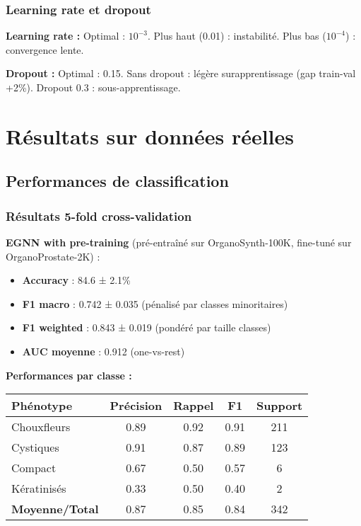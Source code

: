 \subsubsection{Learning rate et dropout}

\textbf{Learning rate :}
Optimal : $10^{-3}$. Plus haut (0.01) : instabilité. Plus bas ($10^{-4}$) : convergence lente.

\textbf{Dropout :}
Optimal : 0.15. Sans dropout : légère surapprentissage (gap train-val +2\%). Dropout 0.3 : sous-apprentissage.

\section{Résultats sur données réelles}

\subsection{Performances de classification}

\subsubsection{Résultats 5-fold cross-validation}

\textbf{EGNN with pre-training} (pré-entraîné sur OrganoSynth-100K, fine-tuné sur OrganoProstate-2K) :
\begin{itemize}
    \item \textbf{Accuracy} : 84.6 ± 2.1\%
    \item \textbf{F1 macro} : 0.742 ± 0.035 (pénalisé par classes minoritaires)
    \item \textbf{F1 weighted} : 0.843 ± 0.019 (pondéré par taille classes)
    \item \textbf{AUC moyenne} : 0.912 (one-vs-rest)
\end{itemize}

\textbf{Performances par classe :}
\begin{center}
\begin{tabular}{|l|c|c|c|c|}
\hline
\textbf{Phénotype} & \textbf{Précision} & \textbf{Rappel} & \textbf{F1} & \textbf{Support} \\
\hline
Chouxfleurs & 0.89 & 0.92 & 0.91 & 211 \\
Cystiques & 0.91 & 0.87 & 0.89 & 123 \\
Compact & 0.67 & 0.50 & 0.57 & 6 \\
Kératinisés & 0.33 & 0.50 & 0.40 & 2 \\
\hline
\textbf{Moyenne/Total} & 0.87 & 0.85 & 0.84 & 342 \\
\hline
\end{tabular}
\end{center}

